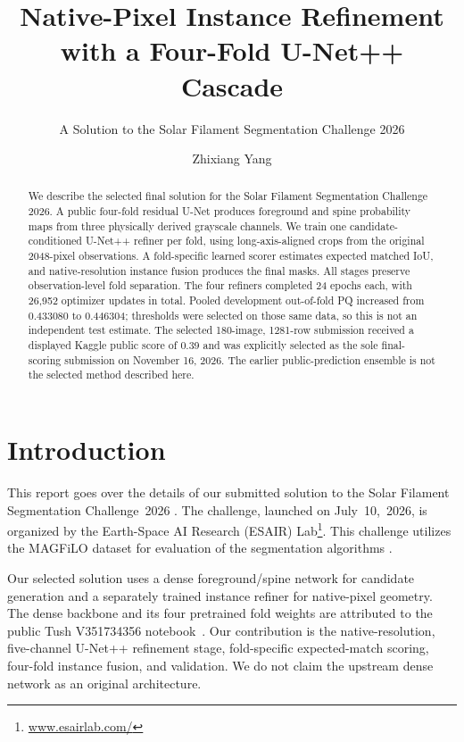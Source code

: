 \documentclass[sigconf]{acmart}
\begin{document}
\title{Native-Pixel Instance Refinement with a Four-Fold U-Net++ Cascade}
\subtitle{A Solution to the Solar Filament Segmentation Challenge 2026}
\author{Zhixiang Yang}
\begin{abstract}
We describe the selected final solution for the Solar Filament Segmentation Challenge 2026. A public four-fold residual U-Net produces foreground and spine probability maps from three physically derived grayscale channels. We train one candidate-conditioned U-Net++ refiner per fold, using long-axis-aligned crops from the original 2048-pixel observations. A fold-specific learned scorer estimates expected matched IoU, and native-resolution instance fusion produces the final masks. All stages preserve observation-level fold separation. The four refiners completed 24 epochs each, with 26,952 optimizer updates in total. Pooled development out-of-fold PQ increased from 0.433080 to 0.446304; thresholds were selected on those same data, so this is not an independent test estimate. The selected 180-image, 1281-row submission received a displayed Kaggle public score of 0.39 and was explicitly selected as the sole final-scoring submission on November 16, 2026. The earlier public-prediction ensemble is not the selected method described here.
\end{abstract}
\maketitle

\section{Introduction}
This report goes over the details of our submitted solution to the Solar Filament Segmentation Challenge~2026 \cite{filament-segmentation-2026}. The challenge, launched on July~10,~2026, is organized by the Earth-Space AI Research (ESAIR) Lab\footnote{\href{https://www.esairlab.com/home}{www.esairlab.com/}}. This challenge utilizes the MAGFiLO dataset for evaluation of the segmentation algorithms \cite{ahmadzadeh2024dataset}.

Our selected solution uses a dense foreground/spine network for candidate generation and a separately trained instance refiner for native-pixel geometry. The dense backbone and its four pretrained fold weights are attributed to the public Tush V351734356 notebook~\cite{tush2026}. Our contribution is the native-resolution, five-channel U-Net++ refinement stage, fold-specific expected-match scoring, four-fold instance fusion, and validation. We do not claim the upstream dense network as an original architecture.
\end{document}
